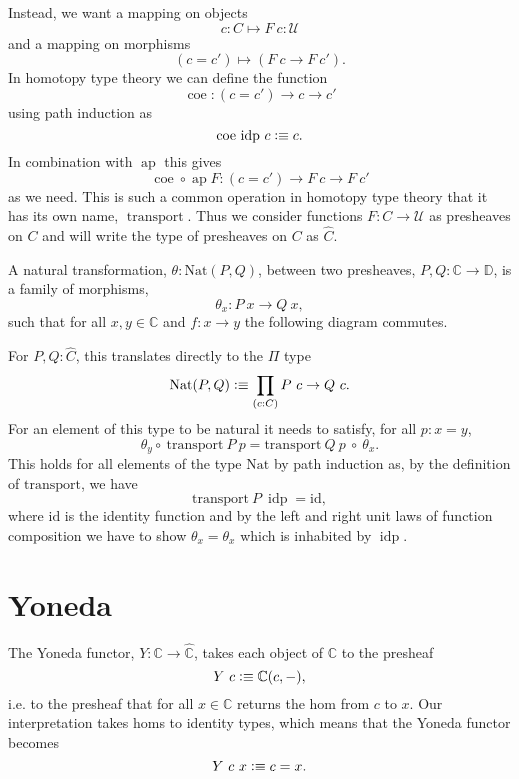 \documentclass[12pt, parskip, DIV=14]{scrbook}
\newcommand{\defeq}{\vcentcolon\equiv}
\renewcommand{\circ}{\vysmwhtcircle}
\newcommand{\ap}{\operatorname{ap}}
\newcommand{\idp}{\operatorname{idp}}
\newcommand{\coe}{\operatorname{coe}}
\newcommand{\transport}{\operatorname{transport}}
\begin{document}
Instead, we want a mapping on objects
$$c : C \mapsto F~c : \mathcal{U}$$
and a mapping on morphisms
$$(c = c') \mapsto (F~c \to F~c').$$ In homotopy type theory we can define the function
$$\coe : (c = c') \to c \to c'$$
using path induction as
$$\coe\,\idp\,c \defeq c.$$
In combination with $\ap$ this gives
$$\coe \circ \ap F : (c = c') \to F~c \to F~c'$$
as we need. This is such a common operation in homotopy type theory that it has its own name, $\transport$. Thus we consider functions $F : C \to \mathcal{U}$ as presheaves on $C$ and will write the type of presheaves on $C$ as $\widehat{C}$.

A natural transformation, $\theta : \mathrm{Nat}(P , Q)$, between two presheaves, $P , Q : \mathbb{C} \to \mathbb{D}$, is a family of morphisms, $$\theta_x : P~x \to Q~x,$$ such that for all $x , y \in \mathbb{C}$ and $f : x \to y$ the following diagram commutes.

\begin{center}
\end{center}

For $P , Q : \widehat{C}$, this translates directly to the $\Pi$ type $$\mathrm{Nat}(P,Q) \defeq \prod_{(c : C)} P~c \to Q~c.$$ For an element of this type to be natural it needs to satisfy, for all $p : x = y$, $$\theta_y \circ~\mathrm{transport}~P~p = \mathrm{transport}~Q~p~\circ~\theta_x.$$
This holds for all elements of the type $\mathrm{Nat}$ by path induction as, by the definition of $\mathrm{transport}$, we have $$\mathrm{transport}~P~\idp = \mathrm{id},$$ where $\mathrm{id}$ is the identity function and by the left and right unit laws of function composition we have to show $\theta_x = \theta_x$ which is inhabited by $\idp$.

\section{Yoneda}

The Yoneda functor, $Y : \mathbb{C} \to \widehat{\mathbb{C}}$, takes each object of $\mathbb{C}$ to the presheaf $$Y~c \defeq \mathbb{C}(c,-),$$ i.e. to the presheaf that for all $x \in \mathbb{C}$ returns the hom from $c$ to $x$. Our interpretation takes homs to identity types, which means that the Yoneda functor becomes $$Y~c~x \vcentcolon\equiv c = x.$$
\end{document}
